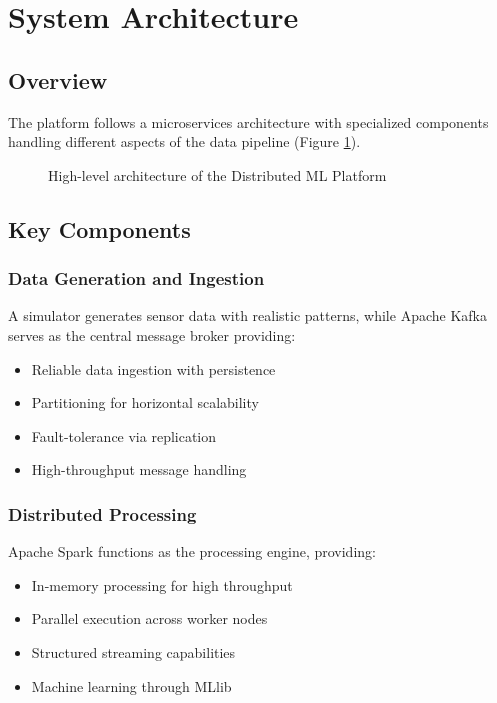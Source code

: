 \documentclass[11pt, a4paper]{article}
\begin{document}
\section{System Architecture}
\subsection{Overview}
The platform follows a microservices architecture with specialized components handling different aspects of the data pipeline (Figure \ref{fig:architecture}).

\begin{figure}[h]
  \centering
  \caption{High-level architecture of the Distributed ML Platform}
  \label{fig:architecture}
\end{figure}

\subsection{Key Components}

\subsubsection{Data Generation and Ingestion}
A simulator generates sensor data with realistic patterns, while Apache Kafka serves as the central message broker providing:

\begin{minipage}{0.48\textwidth}
\begin{itemize}[leftmargin=*]
  \item Reliable data ingestion with persistence
  \item Partitioning for horizontal scalability
  \item Fault-tolerance via replication
  \item High-throughput message handling
\end{itemize}
\end{minipage}
\begin{minipage}{0.48\textwidth}
  \centering
  \label{fig:kafka}
\end{minipage}

\subsubsection{Distributed Processing}
Apache Spark functions as the processing engine, providing:
\begin{itemize}[leftmargin=*]
  \item In-memory processing for high throughput
  \item Parallel execution across worker nodes
  \item Structured streaming capabilities
  \item Machine learning through MLlib
\end{itemize}
\end{document}
